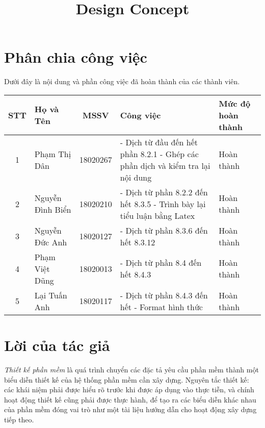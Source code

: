 \documentclass[12pt, a4paper]{article}
\title{Design Concept}
\begin{document}
	
	\clearpage
	
	\section*{Phân chia công việc}
	Dưới đây là nội dung và phần công việc đã hoàn thành của các thành viên.
	\begin{table}[H]
	\centering
	\begin{tabular}{|c | l | c | p{10em} |l|}
		\hline STT & Họ và Tên & MSSV & Công việc & Mức độ hoàn thành \\
		\hline 1 & Phạm Thị Dân & 18020267 & - Dịch từ đầu đến hết phần 8.2.1 \newline - Ghép các phần dịch và kiểm tra lại nội dung & Hoàn thành \\
		\hline 2 & Nguyễn Đình Biển & 18020210 & - Dịch từ phần 8.2.2 đến hết 8.3.5 \newline- Trình bày lại tiểu luận bằng Latex & Hoàn thành \\
		\hline 3 & Nguyễn Đức Anh & 18020127 & - Dịch từ phần 8.3.6 đến hết 8.3.12  & Hoàn thành \\
		\hline 4 & Phạm Việt Dũng & 18020013 & - Dịch từ phần 8.4 đến hết 8.4.3 & Hoàn thành \\
		\hline 5 & Lại Tuấn Anh & 18020117 & - Dịch từ phần 8.4.3 đến hết \newline- Format hình thức & Hoàn thành  \\
		\hline
	\end{tabular}
	\end{table}
	
	\clearpage
	
	\tableofcontents 
	\clearpage
	
	\listoffigures
	
	\listoftables

	\printglossary[type=\acronymtype, title=Thuật ngữ viết tắt]
	\clearpage
	
	
	\clearpage
	
	\section*{Lời của tác giả}
	\textit{Thiết kế phần mềm}  là quá trình chuyển các đặc tả yêu cầu phần mềm thành một biểu diễn thiết kế của hệ thống phần mềm cần xây dựng. Nguyên tắc thiết kế: các khái niệm phải được hiểu rõ trước khi được áp dụng vào thực tiễn, và chính hoạt động thiết kế cũng phải được thực hành, để tạo ra các biểu diễn khác nhau của phần mềm đóng vai trò như một tài liệu hướng dẫn cho hoạt động xây dựng tiếp theo.
	
\end{document}
